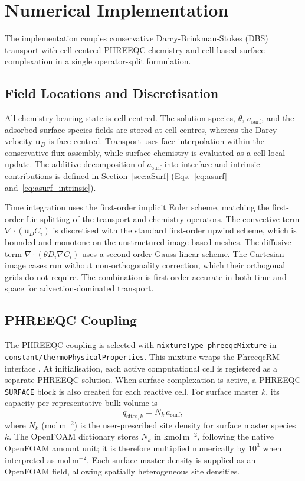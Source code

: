 \section{Numerical Implementation}

The implementation couples conservative Darcy-Brinkman-Stokes (DBS) transport
with cell-centred PHREEQC chemistry and cell-based surface complexation in a
single operator-split formulation.

\subsection{Field Locations and Discretisation}

All chemistry-bearing state is cell-centred. The solution species, $\theta$,
$a_{\mathrm{surf}}$, and the adsorbed surface-species fields are stored at cell
centres, whereas the Darcy velocity $\bm{u}_D$ is face-centred. Transport uses
face interpolation within the conservative flux assembly, while surface
chemistry is evaluated as a cell-local update. The additive decomposition of
$a_{\mathrm{surf}}$ into interface and intrinsic contributions is defined in
Section~\ref{sec:aSurf}
(Eqs.~\eqref{eq:asurf} and~\eqref{eq:asurf_intrinsic}).

Time integration uses the first-order implicit Euler scheme, matching the
first-order Lie splitting of the transport and chemistry operators. The
convective term $\nabla\cdot(\bm{u}_D C_i)$ is discretised with the standard
first-order upwind scheme, which is bounded and monotone on the unstructured
image-based meshes. The diffusive term $\nabla\cdot(\theta D_i \nabla C_i)$
uses a second-order Gauss linear scheme. The Cartesian image cases run without
non-orthogonality correction, which their orthogonal grids do not require. The
combination is first-order accurate in both time and space for
advection-dominated transport.

\subsection{PHREEQC Coupling}

The PHREEQC coupling is selected with
\texttt{mixtureType phreeqcMixture} in
\texttt{constant/thermoPhysicalProperties}. This mixture wraps the PhreeqcRM
interface \citep{parkhurst2015phreeqcrm}. At
initialisation, each active computational cell is registered as a separate
PHREEQC solution. When surface complexation is active, a PHREEQC \texttt{SURFACE}
block is also created for each reactive cell. For surface master $k$, its
capacity per representative bulk volume is
\begin{equation}
q_{\mathrm{sites},k} = N_k \, a_{\mathrm{surf}},
\label{eq:nsites}
\end{equation}
where $N_k$ (mol\,m$^{-2}$) is the user-prescribed site density for surface
master species $k$.
The OpenFOAM dictionary stores $N_k$ in kmol\,m$^{-2}$, following the native
OpenFOAM amount unit; it is therefore multiplied numerically by $10^3$ when
interpreted as mol\,m$^{-2}$. Each surface-master density is supplied as an
OpenFOAM field, allowing spatially heterogeneous site densities.

